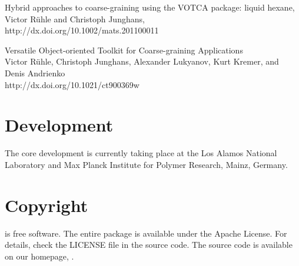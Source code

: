 \vspace{0.1cm}
\noindent
\cite{ruhle2011hybrid} Hybrid approaches to coarse-graining using the VOTCA package: liquid hexane, \\
Victor R\"uhle and Christoph Junghans, \\
{http://dx.doi.org/10.1002/mats.201100011}

\vspace{0.1cm}
\noindent
\cite{Ruehle:2009.a} Versatile Object-oriented Toolkit for Coarse-graining Applications \\
Victor R\"uhle, Christoph Junghans, Alexander Lukyanov, Kurt Kremer, and Denis Andrienko \\
{http://dx.doi.org/10.1021/ct900369w}

\section*{Development}
The core development is currently taking place at the Los Alamos National Laboratory and Max Planck Institute for Polymer Research, Mainz, Germany.

\section*{Copyright}
\votca is free software. The entire package is available under the Apache License. For details, check
the LICENSE file in the source code. The \votca source code is available on our homepage, .

\vfill
